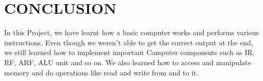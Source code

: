 \documentclass[pdftex,12pt,a4paper]{article}
\begin{document}
\section{CONCLUSION}
In this Project, we have learnt how a basic computer works and performs various instructions. Even though we weren't able to get the correct output at the end, we still learned how to implement important Computer components such as IR, RF, ARF, ALU unit and so on. We also learned how to access and manipulate memory and do operations like read and write from and to it.

\newpage
\end{document}
